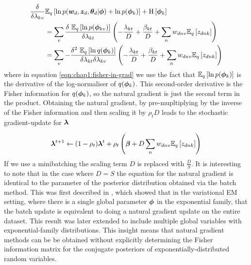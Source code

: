 \begin{align}
\frac{\delta}{\delta \lambda_{kv}} &\ex{\ln p(\wdoc,\zd, \thd|\param) + \ln p(\param_k)}{q} + \ent{\param_k} \\
& = 
    \sum_v \frac{\delta\text{ } \ex{\ln p(\param_{kv})}{q}}{\delta \lambda_{kt}} 
    \left( 
        -\frac{\lambda_{kt}}{D}
        +\frac{\beta_{kt}}{D}
        +\sum_n w_{dnv}\ex{\zdnk}{q}
    \right)\\
& = 
    \sum_v -\frac{\delta^2 \text{ } \ex{\ln q(\param_k)}{q}}{\delta \lambda_{kt} \delta \lambda_{kv}} 
    \left( 
        -\frac{\lambda_{kt}}{D}
        +\frac{\beta_{kt}}{D}
        +\sum_n w_{dnv}\ex{\zdnk}{q}
    \right) \label{eqn:chap1:fisher-in-grad}
\end{align}
where in equation \eqref{eqn:chap1:fisher-in-grad} we use the fact that $\ex{\ln p(\param_k)}{q}$ is the derivative of the log-normaliser of $q(\param_k)$. This second-order derivative is the Fisher information for $q(\param_k)$, so the natural gradient is just the second term in the product. Obtaining the natural gradient, by pre-mupltiplying by the inverse of the Fisher information and then scaling it by $\rho_t D$ leads to the stochastic gradient-update for $\varparam$

\begin{align}
\varparam^{t+1} \leftarrow (1-\rho_t) \varparam^t + \rho_t \left( 
        \vv{\beta}
        + D \sum_n w_{dnv}\ex{\zdnk}{q}
    \right)
\end{align} 
If we use a minibatching the scaling term $D$ is replaced with $\frac{D}{S}$. It is interesting to note that in the case where $D = S$ the equation for the natural gradient is identical to the parameter of the posterior distribution obtained via the batch method. This was first described in \cite{Sato2001}, which showed that in the variational EM setting, where there is a single global parameter $\param$ in the exponential family, that the batch update is equivalent to doing a natural gradient update on the entire dataset. This result was later extended\cite{Hoffman2012} to include multiple global variables with exponential-family distributions. This insight means that natural gradient methods can be be obtained without explicitly determining the Fisher information matrix for the conjugate posteriors of exponentially-distributed random variables.

